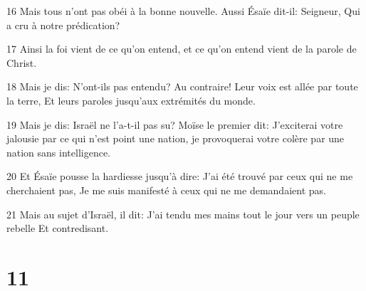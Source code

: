 \par 16 Mais tous n'ont pas obéi à la bonne nouvelle. Aussi Ésaïe dit-il: Seigneur, Qui a cru à notre prédication?
\par 17 Ainsi la foi vient de ce qu'on entend, et ce qu'on entend vient de la parole de Christ.
\par 18 Mais je dis: N'ont-ils pas entendu? Au contraire! Leur voix est allée par toute la terre, Et leurs paroles jusqu'aux extrémités du monde.
\par 19 Mais je dis: Israël ne l'a-t-il pas su? Moïse le premier dit: J'exciterai votre jalousie par ce qui n'est point une nation, je provoquerai votre colère par une nation sans intelligence.
\par 20 Et Ésaïe pousse la hardiesse jusqu'à dire: J'ai été trouvé par ceux qui ne me cherchaient pas, Je me suis manifesté à ceux qui ne me demandaient pas.
\par 21 Mais au sujet d'Israël, il dit: J'ai tendu mes mains tout le jour vers un peuple rebelle Et contredisant.

\chapter{11}

